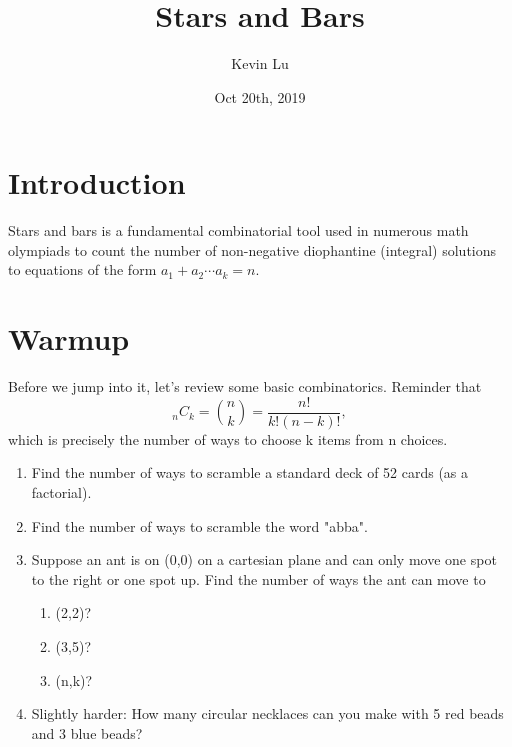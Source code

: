 \documentclass[11pt]{article}
\title{Stars and Bars}
\author{Kevin Lu}
\date{Oct 20th, 2019}
\begin{document}
    \maketitle

    \section{Introduction}
    Stars and bars is a fundamental combinatorial tool used in numerous math olympiads to count the number of non-negative diophantine (integral) solutions to equations of the form $a_1+a_2\cdots a_k=n$.
    \section{Warmup}
    Before we jump into it, let's review some basic combinatorics. Reminder that
    \begin{equation}
        _nC_k = {n\choose k} =\frac{n!}{k!(n-k)!},
    \end{equation}
    which is precisely the number of ways to choose k items from n choices.
    \begin{enumerate}
        \item Find the number of ways to scramble a standard deck of 52 cards (as a factorial).
        \item Find the number of ways to scramble the word "abba".
        \item Suppose an ant is on (0,0) on a cartesian plane and can only move one spot to the right or one spot up. Find the number of ways the ant can move to
        \begin{enumerate}
            \item (2,2)?
            \item (3,5)?
            \item (n,k)?
        \end{enumerate}
        \item Slightly harder: How many circular necklaces can you make with 5 red beads and 3 blue beads?
    \end{enumerate}
\end{document}
